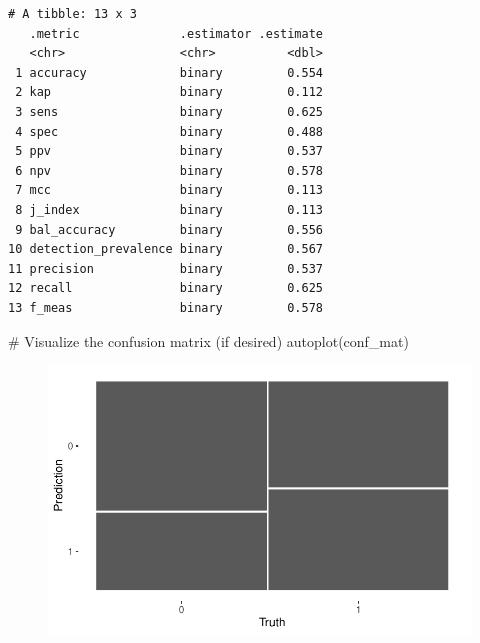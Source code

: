 \documentclass[
  letterpaper,
  DIV=11,
  numbers=noendperiod]{scrartcl}
\newenvironment{Shaded}{\begin{snugshade}}{\end{snugshade}}
\newcommand{\CommentTok}[1]{\textcolor[rgb]{0.37,0.37,0.37}{#1}}
\newcommand{\FunctionTok}[1]{\textcolor[rgb]{0.28,0.35,0.67}{#1}}
\newcommand{\NormalTok}[1]{\textcolor[rgb]{0.00,0.23,0.31}{#1}}
\begin{document}
\begin{verbatim}
# A tibble: 13 x 3
   .metric              .estimator .estimate
   <chr>                <chr>          <dbl>
 1 accuracy             binary         0.554
 2 kap                  binary         0.112
 3 sens                 binary         0.625
 4 spec                 binary         0.488
 5 ppv                  binary         0.537
 6 npv                  binary         0.578
 7 mcc                  binary         0.113
 8 j_index              binary         0.113
 9 bal_accuracy         binary         0.556
10 detection_prevalence binary         0.567
11 precision            binary         0.537
12 recall               binary         0.625
13 f_meas               binary         0.578
\end{verbatim}

\begin{Shaded}
\begin{Highlighting}[]
\CommentTok{\# Visualize the confusion matrix (if desired)}
\FunctionTok{autoplot}\NormalTok{(conf\_mat)}
\end{Highlighting}
\end{Shaded}

\begin{figure}[H]

{\centering \includegraphics{assignment3_files/figure-pdf/LOGSTIC-Junyi-1.pdf}

}

\end{figure}
\end{document}
